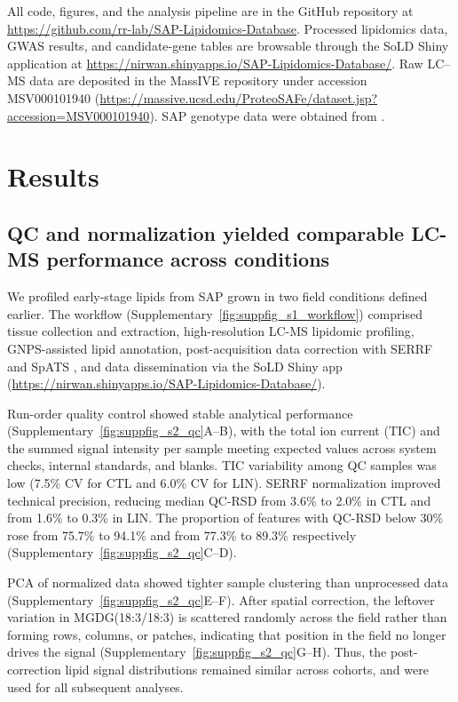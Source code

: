 \documentclass[9pt,twocolumn,twoside]{rilabRxiv}
\begin{document}
All code, figures, and the analysis pipeline are in the GitHub repository at \url{https://github.com/rr-lab/SAP-Lipidomics-Database}. Processed lipidomics data, GWAS results, and candidate-gene tables are browsable through the SoLD Shiny application at \url{https://nirwan.shinyapps.io/SAP-Lipidomics-Database/}. Raw LC--MS data are deposited in the MassIVE repository under accession MSV000101940 (\url{https://massive.ucsd.edu/ProteoSAFe/dataset.jsp?accession=MSV000101940}). SAP genotype data were obtained from \citet{Boatwright2022}.

\section{Results}

\subsection*{QC and normalization yielded comparable LC-MS performance across conditions}

We profiled early-stage lipids from SAP grown in two field conditions defined earlier. The workflow (Supplementary~\ref{fig:suppfig_s1_workflow}) comprised tissue collection and extraction, high-resolution LC-MS lipidomic profiling, GNPS-assisted lipid annotation, post-acquisition data correction with SERRF and SpATS \citep{Fan2019, RodriguezAlvarez2018}, and data dissemination via the SoLD Shiny app (\url{https://nirwan.shinyapps.io/SAP-Lipidomics-Database/}).

Run-order quality control showed stable analytical performance (Supplementary~\ref{fig:suppfig_s2_qc}A--B), with the total ion current (TIC) and the summed signal intensity per sample meeting expected values across system checks, internal standards, and blanks. TIC variability among QC samples was low (7.5\% CV for CTL and 6.0\% CV for LIN). SERRF normalization improved technical precision, reducing median QC-RSD from 3.6\% to 2.0\% in CTL and from 1.6\% to 0.3\% in LIN. The proportion of features with QC-RSD below 30\% rose from 75.7\% to 94.1\% and from 77.3\% to 89.3\% respectively (Supplementary~\ref{fig:suppfig_s2_qc}C--D).

PCA of normalized data showed tighter sample clustering than unprocessed data (Supplementary~\ref{fig:suppfig_s2_qc}E--F). After spatial correction, the leftover variation in MGDG(18:3/18:3) is scattered randomly across the field rather than forming rows, columns, or patches, indicating that position in the field no longer drives the signal (Supplementary~\ref{fig:suppfig_s2_qc}G--H). Thus, the post-correction lipid signal distributions remained similar across cohorts, and were used for all subsequent analyses.
\end{document}
